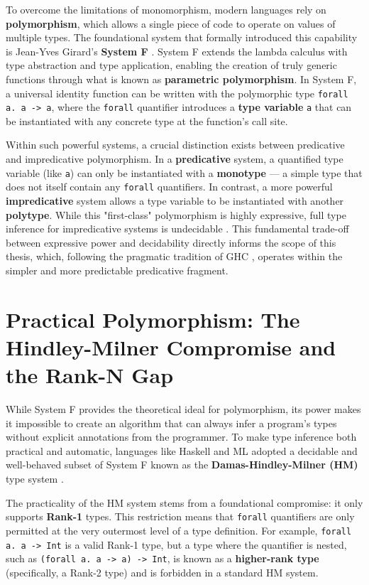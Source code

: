To overcome the limitations of monomorphism, modern languages rely on \textbf{polymorphism}, which allows a single piece of code to operate on values of multiple types. The foundational system that formally introduced this capability is Jean-Yves Girard's \textbf{System F} \cite{girard-system-f}. System F extends the lambda calculus with type abstraction and type application, enabling the creation of truly generic functions through what is known as \textbf{parametric polymorphism}. In System F, a universal identity function can be written with the polymorphic type \texttt{forall a. a -> a}, where the \texttt{forall} quantifier introduces a \textbf{type variable} \texttt{a} that can be instantiated with any concrete type at the function's call site.

Within such powerful systems, a crucial distinction exists between predicative and impredicative polymorphism. In a \textbf{predicative} system, a quantified type variable (like \texttt{a}) can only be instantiated with a \textbf{monotype} --- a simple type that does not itself contain any \texttt{forall} quantifiers. In contrast, a more powerful \textbf{impredicative} system allows a type variable to be instantiated with another \textbf{polytype}. While this "first-class" polymorphism is highly expressive, full type inference for impredicative systems is undecidable \cite{wells-typability-1999, serrano-quick-2020}. This fundamental trade-off between expressive power and decidability directly informs the scope of this thesis, which, following the pragmatic tradition of GHC \cite{jones-practical-2007}, operates within the simpler and more predictable predicative fragment.

\section{Practical Polymorphism: The Hindley-Milner Compromise and the Rank-N Gap}
\label{sec:LitReviewHM}

While System F provides the theoretical ideal for polymorphism, its power makes it impossible to create an algorithm that can always infer a program's types without explicit annotations from the programmer. To make type inference both practical and automatic, languages like Haskell and ML adopted a decidable and well-behaved subset of System F known as the \textbf{Damas-Hindley-Milner (HM)} type system \cite{damas-milner}.

The practicality of the HM system stems from a foundational compromise: it only supports \textbf{Rank-1} types. This restriction means that \texttt{forall} quantifiers are only permitted at the very outermost level of a type definition. For example, \texttt{forall a. a -> Int} is a valid Rank-1 type, but a type where the quantifier is nested, such as \texttt{(forall a. a -> a) -> Int}, is known as a \textbf{higher-rank type} (specifically, a Rank-2 type) and is forbidden in a standard HM system.

